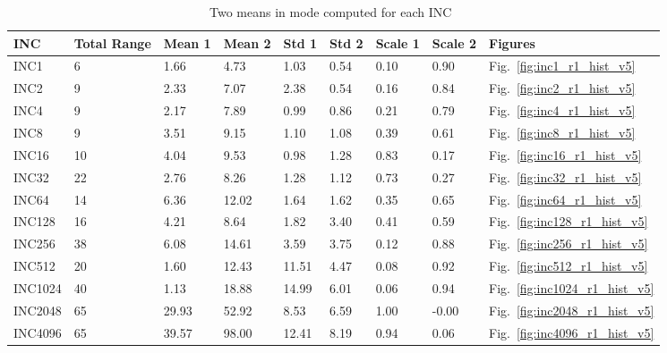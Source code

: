 \begin{table}[h]
\begin{center}
\begin{tabular}{|l|l|l|l|l|l|l|l|l|} \hline
INC        & Total Range & Mean 1 & Mean 2 & Std 1 & Std 2 & Scale 1 & Scale 2 & Figures \\ \hline
INC1      & 6 & 1.66  & 4.73 & 1.03 & 0.54 & 0.10 & 0.90  & Fig.~\ref{fig:inc1_r1_hist_v5}\\ \hline
INC2      & 9 & 2.33  & 7.07 & 2.38 & 0.54 & 0.16 & 0.84  & Fig.~\ref{fig:inc2_r1_hist_v5} \\ \hline
INC4      & 9 & 2.17  & 7.89 & 0.99 & 0.86 & 0.21 & 0.79  & Fig.~\ref{fig:inc4_r1_hist_v5} \\ \hline
INC8      & 9 & 3.51  & 9.15 & 1.10 & 1.08 & 0.39 & 0.61  & Fig.~\ref{fig:inc8_r1_hist_v5}\\ \hline
INC16    & 10 & 4.04  & 9.53 & 0.98 & 1.28 & 0.83 & 0.17  & Fig.~\ref{fig:inc16_r1_hist_v5}\\ \hline
INC32    & 22 & 2.76  & 8.26 & 1.28 & 1.12 & 0.73 & 0.27  & Fig.~\ref{fig:inc32_r1_hist_v5}\\ \hline
INC64    & 14 & 6.36  & 12.02 & 1.64 & 1.62 &  0.35 & 0.65  & Fig.~\ref{fig:inc64_r1_hist_v5}\\ \hline
INC128  & 16 & 4.21  & 8.64 & 1.82 & 3.40 & 0.41 & 0.59  & Fig.~\ref{fig:inc128_r1_hist_v5}\\ \hline
INC256  & 38 & 6.08  & 14.61  & 3.59 & 3.75 & 0.12 & 0.88  & Fig.~\ref{fig:inc256_r1_hist_v5}\\ \hline
INC512  & 20 & 1.60  & 12.43   & 11.51 & 4.47 & 0.08 & 0.92  & Fig.~\ref{fig:inc512_r1_hist_v5}\\ \hline
INC1024 & 40 & 1.13  & 18.88  & 14.99 & 6.01 & 0.06 & 0.94 & Fig.~\ref{fig:inc1024_r1_hist_v5}\\ \hline
INC2048 & 65 & 29.93 & 52.92 & 8.53 & 6.59 & 1.00 & -0.00 & Fig.~\ref{fig:inc2048_r1_hist_v5}\\ \hline
INC4096 & 65 & 39.57 & 98.00 & 12.41 & 8.19 & 0.94 & 0.06  & Fig.~\ref{fig:inc4096_r1_hist_v5}\\ \hline
\end{tabular}
\end{center}
\vspace{-.2in}
\caption{Two means in mode computed for each INC~\label{tab:binormal_fit}}
\end{table}

\pagebreak
\clearpage

